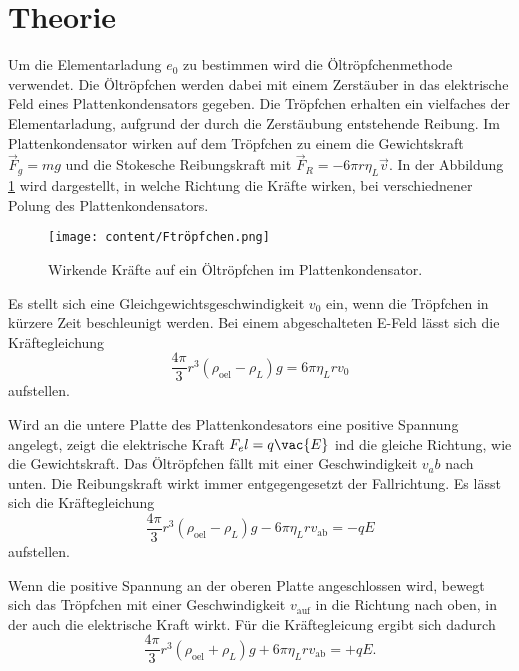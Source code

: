 \section{Theorie}
\label{sec:Theorie}
Um die Elementarladung $e_0$ zu bestimmen wird die Öltröpfchenmethode verwendet.
Die Öltröpfchen werden dabei mit einem Zerstäuber in das elektrische Feld eines Plattenkondensators gegeben.
Die Tröpfchen erhalten ein vielfaches der Elementarladung, aufgrund der durch die Zerstäubung entstehende Reibung.
Im Plattenkondensator wirken auf dem Tröpfchen zu einem die Gewichtskraft $\vec{F}_g = mg$ und die Stokesche Reibungskraft mit
$\vec{F}_R = -6 \pi r \eta_L \vec{v}$.
In der Abbildung \ref{fig:Ftröpfchen} wird dargestellt, in welche Richtung die Kräfte wirken, bei verschiednener Polung des Plattenkondensators.

\begin{figure}[H]
    \centering
    \texttt{[image: content/Ftröpfchen.png]}
    \caption{Wirkende Kräfte auf ein Öltröpfchen im Plattenkondensator.}
    \label{fig:Ftröpfchen}
\end{figure}

Es stellt sich eine Gleichgewichtsgeschwindigkeit $v_0$ ein, wenn die Tröpfchen in kürzere Zeit beschleunigt werden.
Bei einem abgeschalteten E-Feld lässt sich die Kräftegleichung 
\begin{equation}
    \label{Faus}
    \frac{4 \pi}{3} r^3 (\rho_\text{oel} - \rho_L) g = 6 \pi \eta_L r v_0
\end{equation}
aufstellen.

Wird an die untere Platte des Plattenkondesators eine positive Spannung angelegt, zeigt die elektrische Kraft $F_el = q \vac{E}$ ind die gleiche Richtung, wie die Gewichtskraft.
Das Öltröpfchen fällt mit einer Geschwindigkeit $v_ab$ nach unten. 
Die Reibungskraft wirkt immer entgegengesetzt der Fallrichtung.
Es lässt sich die Kräftegleichung
\begin{equation}
    \label{eq:Fvab}
    \frac{4 \pi}{3} r^3 (\rho_\text{oel} - \rho_L) g - 6 \pi \eta_L r v_\text{ab}= -q E
\end{equation}
aufstellen.

Wenn die positive Spannung an der oberen Platte angeschlossen wird, bewegt sich das Tröpfchen  mit einer Geschwindigkeit $v_\text{auf}$ in die Richtung nach oben,
in der auch die elektrische Kraft wirkt.
Für die Kräftegleicung ergibt sich dadurch
\begin{equation}
    \label{eq:Fvauf}
    \frac{4 \pi}{3} r^3 (\rho_\text{oel} + \rho_L) g + 6 \pi \eta_L r v_\text{ab}= +q E.
\end{equation}

